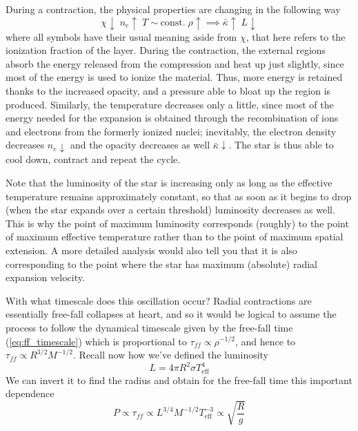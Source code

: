 \par During a contraction, the physical properties are changing in the following way 
\begin{equation*}
    \chi\downarrow\;n_{e}\uparrow\;T\sim\text{const.}\;\rho\uparrow\implies \bar{\kappa}\uparrow\;L\downarrow
\end{equation*}
where all symbols have their usual meaning aside from $\chi$, that here refers to the ionization fraction of the layer. During the contraction, the external regions absorb the energy released from the compression and heat up just slightly, since most of the energy is used to ionize the material. Thus, more energy is retained thanks to the increased opacity, and a pressure able to bloat up the region is produced. Similarly, the temperature decreases only a little, since most of the energy needed for the expansion is obtained through the recombination of ions and electrons from the formerly ionized nuclei; inevitably, the electron density decreases $n_{e}\downarrow$ and the opacity decreases as well $\bar{\kappa}\downarrow$. The star is thus able to cool down, contract and repeat the cycle.
\par Note that the luminosity of the star is increasing only as long as the effective temperature remains approximately constant, so that as soon as it begins to drop (when the star expands over a certain threshold) luminosity decreases as well. This is why the point of maximum luminosity corresponds (roughly) to the point of maximum effective temperature rather than to the point of maximum spatial extension. A more detailed analysis would also tell you that it is also corresponding to the point where the star has maximum (absolute) radial expansion velocity.
\par With what timescale does this oscillation occur? Radial contractions are essentially free-fall collapses at heart, and so it would be logical to assume the process to follow the dynamical timescale given by the free-fall time (\ref{eq:ff_timescale}) which is proportional to $\tau_{ff}\propto \rho^{-1/2}$, and hence to $\tau_{ff}\propto R^{3/2}M^{-1/2}$. Recall now how we've defined the luminosity
\begin{equation*}
    L = 4\pi R^{2}\sigma T_{\text{eff}}^{4}
\end{equation*} 
We can invert it to find the radius and obtain for the free-fall time this important dependence
\begin{equation}
    P \propto \tau_{ff} \propto L^{3/4}M^{-1/2}T_{\text{eff}}^{-3} \propto \sqrt{\frac{R}{g}}
    \label{eq:pulsationalperiod}
\end{equation}
